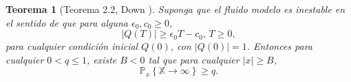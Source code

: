 \documentclass{article}
\newtheorem{Teo}{Teorema}
\newcommand{\prob}{\mathbb{P}}
\begin{document}
\begin{Teo}[Teorema 2.2, Down \cite{Down}]\label{Tma2.2.Down}
Suponga que el fluido modelo es inestable en el sentido de que
para alguna $\epsilon_{0},c_{0}\geq0$,
\begin{equation}\label{Eq.Inestability}
|Q\left(T\right)|\geq\epsilon_{0}T-c_{0}\textrm{,   }T\geq0,
\end{equation}
para cualquier condici\'on inicial $Q\left(0\right)$, con
$|Q\left(0\right)|=1$. Entonces para cualquier $0<q\leq1$, existe
$B<0$ tal que para cualquier $|x|\geq B$,
\begin{equation}
\prob_{x}\left\{\mathbb{X}\rightarrow\infty\right\}\geq q.
\end{equation}
\end{Teo}


\end{document}
